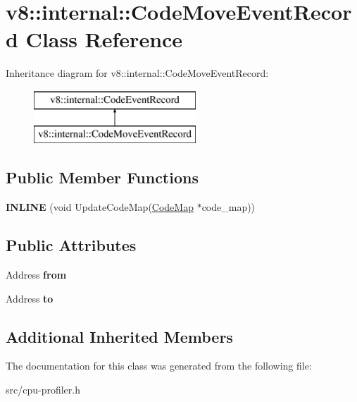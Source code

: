 \hypertarget{classv8_1_1internal_1_1_code_move_event_record}{}\section{v8\+:\+:internal\+:\+:Code\+Move\+Event\+Record Class Reference}
\label{classv8_1_1internal_1_1_code_move_event_record}
Inheritance diagram for v8\+:\+:internal\+:\+:Code\+Move\+Event\+Record\+:\begin{figure}[H]
\begin{center}
\leavevmode
\includegraphics[height=2.000000cm]{classv8_1_1internal_1_1_code_move_event_record}
\end{center}
\end{figure}
\subsection*{Public Member Functions}
\begin{DoxyCompactItemize}
\item 
\hypertarget{classv8_1_1internal_1_1_code_move_event_record_a4f4e0621e8588af0558cba8221180164}{}{\bfseries I\+N\+L\+I\+N\+E} (void Update\+Code\+Map(\hyperlink{classv8_1_1internal_1_1_code_map}{Code\+Map} $\ast$code\+\_\+map))\label{classv8_1_1internal_1_1_code_move_event_record_a4f4e0621e8588af0558cba8221180164}

\end{DoxyCompactItemize}
\subsection*{Public Attributes}
\begin{DoxyCompactItemize}
\item 
\hypertarget{classv8_1_1internal_1_1_code_move_event_record_a706eb1c919e9762fbce40b16422495cf}{}Address {\bfseries from}\label{classv8_1_1internal_1_1_code_move_event_record_a706eb1c919e9762fbce40b16422495cf}

\item 
\hypertarget{classv8_1_1internal_1_1_code_move_event_record_a09d5ae47ce69f2db80de5384e54521c4}{}Address {\bfseries to}\label{classv8_1_1internal_1_1_code_move_event_record_a09d5ae47ce69f2db80de5384e54521c4}

\end{DoxyCompactItemize}
\subsection*{Additional Inherited Members}


The documentation for this class was generated from the following file\+:\begin{DoxyCompactItemize}
\item 
src/cpu-\/profiler.\+h\end{DoxyCompactItemize}
